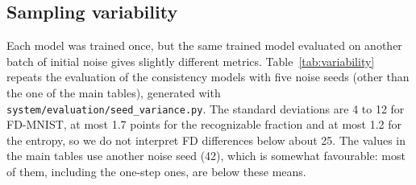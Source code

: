 \documentclass{article}
\begin{document}
\clearpage
\subsection{Sampling variability}
\label{sec:app_variability}

Each model was trained once, but the same trained model evaluated on another
batch of initial noise gives slightly different metrics. Table~\ref{tab:variability}
repeats the evaluation of the consistency models with five noise seeds (other
than the one of the main tables), generated with
\texttt{system/evaluation/seed\_variance.py}. The standard deviations are 4 to 12
for FD-MNIST, at most 1.7 points for the recognizable fraction and at most 1.2
for the entropy, so we do not interpret FD differences below about 25. The values
in the main tables use another noise seed (42), which is somewhat favourable: most
of them, including the one-step ones, are below these means.
\end{document}
